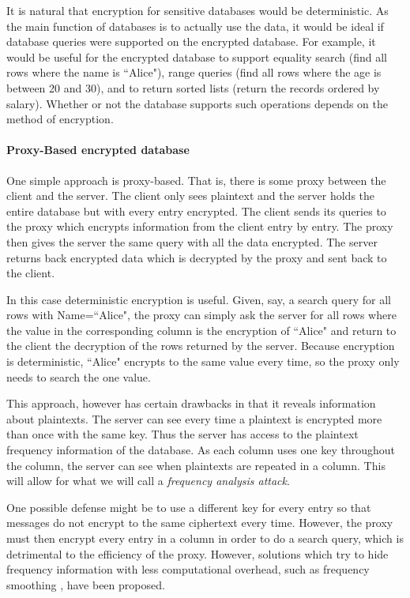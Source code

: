 It is natural that encryption for sensitive databases would be deterministic. As the main function of databases is to actually use the data, it would be ideal if database queries were supported on the encrypted database. For example, it would be useful for the encrypted database to support equality search (find all rows where the name is ``Alice"), range queries (find all rows where the age is between 20 and 30), and to return sorted lists (return the records ordered by salary). Whether or not the database supports such operations depends on the method of encryption. 

\paragraph{Proxy-Based encrypted database} One simple approach is proxy-based. That is, there is some proxy between the client and the server. The client only sees plaintext and the server holds the entire database but with every entry encrypted. The client sends its queries to the proxy which encrypts information from the client entry by entry. The proxy then gives the server the same query with all the data encrypted. The server returns back encrypted data which is decrypted by the proxy and sent back to the client. 

In this case deterministic encryption is useful. Given, say, a search query for all rows with Name=``Alice", the proxy can simply ask the server for all rows where the value in the corresponding column is the encryption of ``Alice" and return to the client the decryption of the rows returned by the server. Because encryption is deterministic, ``Alice" encrypts to the same value every time, so the proxy only needs to search the one value.

This approach, however has certain drawbacks in that it reveals information about plaintexts. The server can see every time a plaintext is encrypted more than once with the same key.
Thus the server has access to the plaintext frequency information of the database. As each column uses one key throughout the column, the server can see when plaintexts are repeated in a column.
This will allow for what we will call a \textit{frequency analysis attack}.
    
One possible defense might be to use a different key for every entry so that messages do not encrypt to the same ciphertext every time. However, the proxy must then encrypt every entry in a column in order to do a search query, which  is detrimental to the efficiency of the proxy. However, solutions which try to hide frequency information with less computational overhead, such as frequency smoothing \cite{Lacharité2018FSE}, have been proposed.

